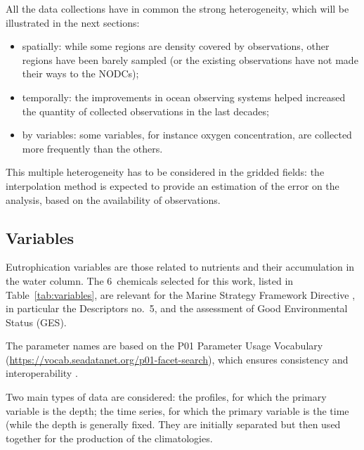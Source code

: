 \documentclass[essd, manuscript]{copernicus}
\begin{document}
All the data collections have in common the strong heterogeneity, which will be illustrated in the next sections: 
\begin{itemize}
\item spatially: while some regions are density covered by observations, other regions have been barely sampled (or the existing observations have not made their ways to the NODCs);
\item temporally: the improvements in ocean observing systems helped increased the quantity of collected observations in the last decades;
\item by variables: some variables, for instance oxygen concentration, are collected more frequently than the others.
\end{itemize}
This multiple heterogeneity has to be considered in the gridded fields: the interpolation method is expected to provide an estimation of the error on the analysis, based on the availability of observations. 


\subsection{Variables\label{sec:variables}}

Eutrophication variables are those related to nutrients and their accumulation in the water column. The 6~chemicals selected for this work, listed in Table~\ref{tab:variables}, are relevant for the Marine Strategy Framework Directive \citep[MSFD,][]{EURO2008}, in particular the Descriptors no.~5, and the assessment of Good Environmental Status (GES). 

The parameter names are based on the P01 Parameter Usage Vocabulary (\url{https://vocab.seadatanet.org/p01-facet-search}), which ensures consistency and interoperability \citep{iocmanualsguides54}. 

Two main types of data are considered: the profiles, for which the primary variable is the depth; the time series, for which the primary variable is the time (while the depth is generally fixed. They are initially separated but then used together for the production of the climatologies. 
\end{document}
